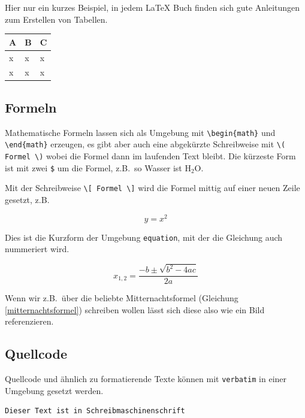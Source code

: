 Hier nur ein kurzes Beispiel, in jedem \LaTeX{} Buch finden sich gute Anleitungen zum Erstellen von Tabellen.

\begin{table}[h]
    \centering
    \begin{tabular}{|l|l|l|}
        A & B & C \\
        \hline
        x & x & x \\
        x & x & x
    \end{tabular}
\end{table}


\subsection{Formeln}

Mathematische Formeln lassen sich als Umgebung mit \verb|\begin{math}| und \verb|\end{math}| erzeugen, es gibt aber auch eine abgekürzte Schreibweise mit \verb|\( Formel \)| wobei die Formel dann im laufenden Text bleibt. Die kürzeste Form ist mit zwei \verb|$| um die Formel, z.B.~so Wasser ist H$_2$O.

Mit der Schreibweise \verb|\[ Formel \]| wird die Formel mittig auf einer neuen Zeile gesetzt, z.B.

\[y = x^2 \]

Dies ist die Kurzform der Umgebung \verb|equation|, mit der die Gleichung auch nummeriert wird. 

\begin{equation}
    x_{1,2} = \frac{-b\pm\sqrt{b^2-4ac}}{2a}
    \label{mitternachtsformel}
\end{equation}

Wenn wir z.B.~über die beliebte Mitternachtsformel (Gleichung \ref{mitternachtsformel}) schreiben wollen lässt sich diese also wie ein Bild referenzieren.



\subsection{Quellcode}

Quellcode und ähnlich zu formatierende Texte können mit \verb|verbatim| in einer Umgebung gesetzt werden.

\begin{verbatim}
Dieser Text ist in Schreibmaschinenschrift
\end{verbatim}

